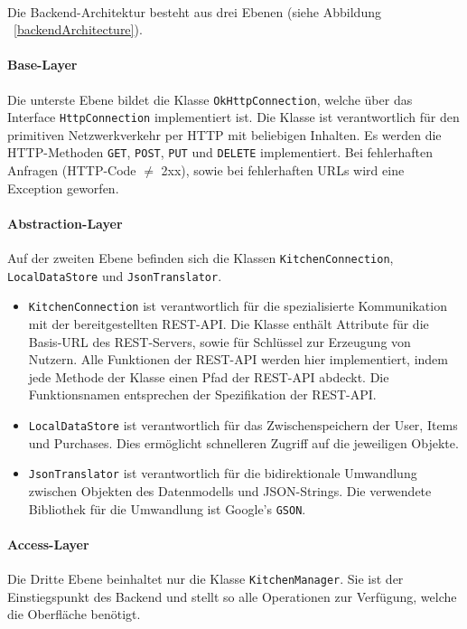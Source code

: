\documentclass{scrartcl}
\begin{document}
			\paragraph*{}
			Die Backend-Architektur besteht aus drei Ebenen (siehe Abbildung ~\ref{backendArchitecture}).
			
			\paragraph*{Base-Layer}
			Die unterste Ebene bildet die Klasse \texttt{OkHttpConnection}, welche über das Interface \texttt{HttpConnection} implementiert ist. Die Klasse ist verantwortlich für den primitiven Netzwerkverkehr per HTTP mit beliebigen Inhalten. Es werden die HTTP-Methoden \texttt{GET}, \texttt{POST}, \texttt{PUT} und \texttt{DELETE} implementiert. Bei fehlerhaften Anfragen (HTTP-Code $\neq$ 2xx), sowie bei fehlerhaften URLs wird eine Exception geworfen.
			
			\paragraph*{Abstraction-Layer}
			Auf der zweiten Ebene befinden sich die Klassen \texttt{KitchenConnection}, \texttt{LocalDataStore} und \texttt{JsonTranslator}.
			
			\begin{itemize}
				\item  \texttt{KitchenConnection} ist verantwortlich für die spezialisierte Kommunikation mit der bereitgestellten REST-API. Die Klasse enthält Attribute für die Basis-URL des REST-Servers, sowie für Schlüssel zur Erzeugung von Nutzern. Alle Funktionen der REST-API werden hier implementiert, indem jede Methode der Klasse einen Pfad der REST-API abdeckt. Die Funktionsnamen entsprechen der Spezifikation der REST-API.
				
				\item \texttt{LocalDataStore} ist verantwortlich für das Zwischenspeichern der User, Items und Purchases. Dies ermöglicht schnelleren Zugriff auf die jeweiligen Objekte.
				
				\item \texttt{JsonTranslator} ist verantwortlich für die bidirektionale Umwandlung zwischen Objekten des Datenmodells und JSON-Strings. Die verwendete Bibliothek für die Umwandlung ist Google's \texttt{GSON}.
			\end{itemize}
		
			\paragraph*{Access-Layer}
			Die Dritte Ebene beinhaltet nur die Klasse \texttt{KitchenManager}. Sie ist der Einstiegspunkt des Backend und stellt so alle Operationen zur Verfügung, welche die Oberfläche benötigt.
		
\end{document}
